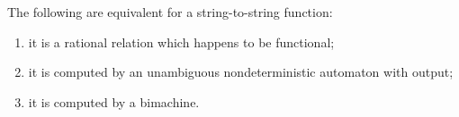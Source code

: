 \begin{theorem}[Eilenberg]\label{thm:bimachines}
    The following are equivalent for a string-to-string function:
    \begin{enumerate}
        \item it is a rational relation which happens to be functional;
        \item it is computed by an unambiguous nondeterministic automaton with output;
        \item it is computed by a bimachine.
    \end{enumerate}
\end{theorem}

